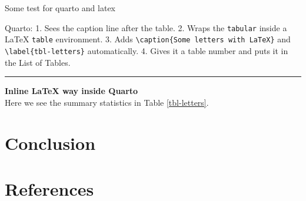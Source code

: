 \documentclass[
  12pt,
  a4paper,
  openany]{scrbook}
\begin{document}
Some test for quarto and latex

Quarto: 1. Sees the caption line after the table. 2. Wraps the
\texttt{tabular} inside a LaTeX \texttt{table} environment. 3. Adds
\texttt{\textbackslash{}caption\{Some\ letters\ with\ LaTeX\}} and
\texttt{\textbackslash{}label\{tbl-letters\}} automatically. 4. Gives it
a table number and puts it in the List of Tables.

\begin{center}\rule{0.5\linewidth}{0.5pt}\end{center}

\textbf{Inline LaTeX way inside Quarto}\\
Here we see the summary statistics in Table \ref{tbl-letters}.

\begin{table}

\caption{\label{tbl-letters}Some letters with LaTeX}


\end{table}%


\chapter{Conclusion}\label{conclusion}


\chapter*{References}\label{references}

\end{document}
